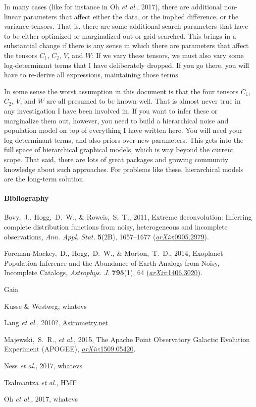 \documentclass[12pt,letterpaper]{article}
\newcommand{\foreign}[1]{\textsl{#1}}
\newcommand{\acronym}[1]{{\small{#1}}}
\newcommand{\etal}{\foreign{et al.}}
\begin{document}
In many cases (like for instance in Oh \etal, 2017), there are
additional non-linear parameters that affect either the data, or the
implied difference, or the variance tensors. That is, there are some
additional search parameters that have to be either optimized or
marginalized out or grid-searched. This brings in a substantial change
if there is any sense in which there are parameters that affect the
tensors $C_1$, $C_2$, $V$, and $W$: If we vary these tensors, we must
also vary some log-determinant terms that I have deliberately
dropped. If you go there, you will have to re-derive all expressions,
maintaining those terms.

In some sense the worst assumption in this document is that the four
tensors $C_1$, $C_2$, $V$, and $W$ are all presumed to be known well.
That is almost never true in any investigation I have been involved
in.  If you want to infer these or marginalize them out, however, you
need to build a hierarchical noise and population model on top of
everything I have written here. You will need your log-determinant
terms, and also priors over new parameters. This gets into the full
space of hierarchical graphical models, which is way beyond the
current scope. That said, there are lots of great packages and growing
community knowledge about such approaches. For problems like these,
hierarchical models are the long-term solution.

\newcommand{\arXiv}[1]{\href{http://arxiv.org/abs/#1}{\textsl{arXiv}:#1}}
\paragraph{Bibliography}
\begin{list}{}{\itemsep=0pt \parskip=0pt \parsep=0pt \leftmargin=\parindent \itemindent=-\parindent}
\item Bovy,~J., Hogg,~D.~W., \& Roweis,~S.~T., 2011,
  Extreme deconvolution: Inferring complete distribution functions from noisy, heterogeneous and incomplete observations,
  \textit{Ann. Appl. Stat.} \textbf{5}(2B), 1657--1677 (\arXiv{0905.2979}).
\item Foreman-Mackey,~D., Hogg,~D.~W., \& Morton,~T.~D., 2014,
  Exoplanet Population Inference and the Abundance of Earth Analogs from Noisy, Incomplete Catalogs,
  \textit{Astrophys. J.} \textbf{795}(1), 64 (\arXiv{1406.3020}).
\item Gaia
\item Kusse \& Westweg, whatevs
\item Lang \etal, 2010?, \url{Astrometry.net}
\item Majewski,~S.~R., \etal, 2015,
  The Apache Point Observatory Galactic Evolution Experiment (\acronym{APOGEE}),
  \arXiv{1509.05420}.
\item Ness \etal, 2017, whatevs
\item Tsalmantza \etal, HMF
\item Oh \etal, 2017, whatevs
\end{list}
\end{document}
